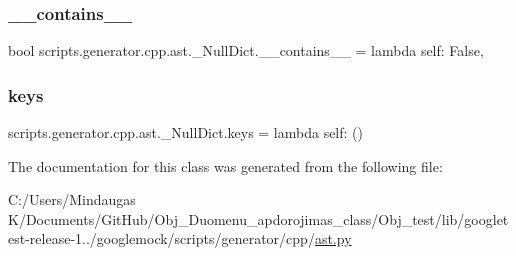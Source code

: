 \subsubsection{\texorpdfstring{\_\_contains\_\_}{\_\_contains\_\_}}
{\footnotesize\ttfamily bool scripts.\+generator.\+cpp.\+ast.\+\_\+\+Null\+Dict.\+\_\+\+\_\+contains\+\_\+\+\_\+ = lambda self\+: False\hspace{0.3cm}{\ttfamily [static]}, {\ttfamily [private]}}

\mbox{\label{classscripts_1_1generator_1_1cpp_1_1ast_1_1___null_dict_a2d7272178e7c8454aa854abec29b7a27}} 
\subsubsection{\texorpdfstring{keys}{keys}}
{\footnotesize\ttfamily scripts.\+generator.\+cpp.\+ast.\+\_\+\+Null\+Dict.\+keys = lambda self\+: ()\hspace{0.3cm}{\ttfamily [static]}}



The documentation for this class was generated from the following file\+:\begin{DoxyCompactItemize}
\item 
C\+:/\+Users/\+Mindaugas K/\+Documents/\+Git\+Hub/\+Obj\+\_\+\+Duomenu\+\_\+apdorojimas\+\_\+class/\+Obj\+\_\+test/lib/googletest-\/release-\/1../googlemock/scripts/generator/cpp/\mbox{\hyperlink{_obj__test_2lib_2googletest-release-1_88_81_2googlemock_2scripts_2generator_2cpp_2ast_8py}{ast.\+py}}\end{DoxyCompactItemize}
